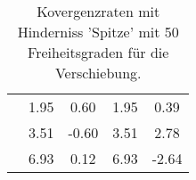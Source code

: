 \begin{table}
\begin{tabular}{c|cc|cc|}
\multicolumn{1}{|c|}{} & \multicolumn{1}{|c|}{      1.95} & \multicolumn{1}{|c|}{      0.60} & \multicolumn{1}{|c|}{      1.95} & \multicolumn{1}{|c|}{      0.39} \\ 
\multicolumn{1}{|c|}{} & \multicolumn{1}{|c|}{      3.51} & \multicolumn{1}{|c|}{     -0.60} & \multicolumn{1}{|c|}{      3.51} & \multicolumn{1}{|c|}{      2.78} \\ 
\multicolumn{1}{|c|}{} & \multicolumn{1}{|c|}{      6.93} & \multicolumn{1}{|c|}{      0.12} & \multicolumn{1}{|c|}{      6.93} & \multicolumn{1}{|c|}{     -2.64} \\ 
\hline 
\end{tabular}\caption{Kovergenzraten mit Hinderniss 'Spitze' mit 50 Freiheitsgraden für die Verschiebung.}\label{tab:Rate_Spitze_level1}
\end{table} 
